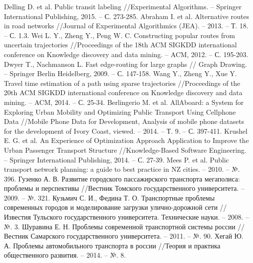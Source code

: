\begin{thebibliography}{10}
     Delling D. et al. Public transit labeling //Experimental Algorithms. -- 
        Springer International Publishing, 2015. -- С. 273-285.
     Abraham I. et al. Alternative routes in road networks //Journal of 
        Experimental Algorithmics (JEA). -- 2013. -- Т. 18. -- С. 1.3.
     Wei L. Y., Zheng Y., Peng W. C. Constructing popular routes from 
        uncertain trajectories //Proceedings of the 18th ACM SIGKDD international conference on 
        Knowledge discovery and data mining. -- ACM, 2012. -- С. 195-203.
     Dwyer T., Nachmanson L. Fast edge-routing for large graphs //
        Graph Drawing. -- Springer Berlin Heidelberg, 2009. -- С. 147-158.
     Wang Y., Zheng Y., Xue Y. Travel time estimation of a path using sparse 
        trajectories //Proceedings of the 20th ACM SIGKDD international conference on Knowledge 
        discovery and data mining. -- ACM, 2014. -- С. 25-34.
     Berlingerio M. et al. AllAboard: a System for Exploring Urban Mobility and 
        Optimizing Public Transport Using Cellphone Data //Mobile Phone Data for Development, Analysis 
        of mobile phone datasets for the development of Ivory Coast, 
        viewed. -- 2014. -- Т. 9. -- С. 397-411.
     Krushel E. G. et al. An Experience of Optimization Approach Application to Improve 
        the Urban Passenger Transport Structure //Knowledge-Based Software Engineering. -- Springer 
        International Publishing, 2014. -- С. 27-39.
     Mees P. et al. Public transport network planning: a guide to best practice in NZ 
        cities. -- 2010. -- №. 396.
     Гузенко А. В. Развитие городского пассажирского транспорта мегаполиса: проблемы 
        и перспективы //Вестник Томского государственного университета. -- 2009. -- №. 321.
     Кузьмич С. И., Федина Т. О. Транспортные проблемы современных городов и 
        моделирование загрузки улично-дорожной сети //Известия Тульского государственного 
        университета. Технические науки. -- 2008. -- №. 3.
     Шуравина Е. Н. Проблемы современной транспортной системы россии //
        Вестник Самарского государственного университета. -- 2011. -- №. 90.
     Хегай Ю. А. Проблемы автомобильного транспорта в россии //Теория и практика 
        общественного развития. -- 2014. -- №. 8.

\end{thebibliography}
